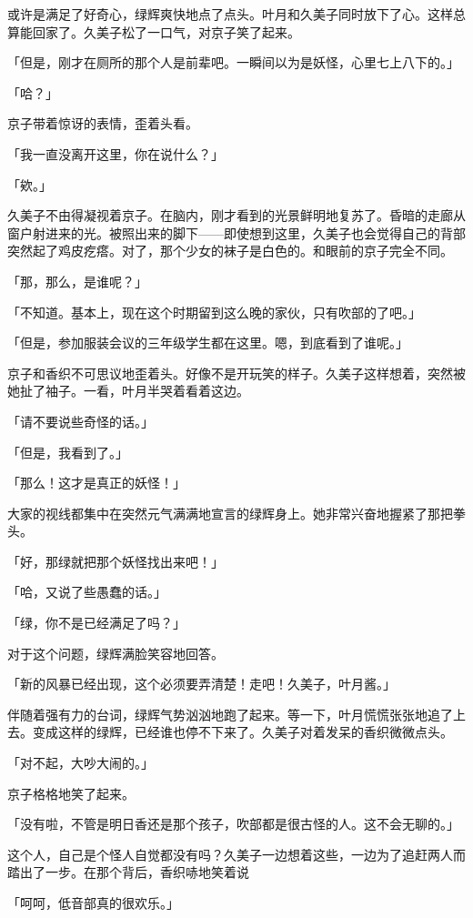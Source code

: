 \documentclass[UTF8]{ctexart}
\begin{document}
    或许是满足了好奇心，绿辉爽快地点了点头。叶月和久美子同时放下了心。这样总算能回家了。久美子松了一口气，对京子笑了起来。

    「但是，刚才在厕所的那个人是前辈吧。一瞬间以为是妖怪，心里七上八下的。」

    「哈？」

    京子带着惊讶的表情，歪着头看。

    「我一直没离开这里，你在说什么？」

    「欸。」

    久美子不由得凝视着京子。在脑内，刚才看到的光景鲜明地复苏了。昏暗的走廊从窗户射进来的光。被照出来的脚下——即使想到这里，久美子也会觉得自己的背部突然起了鸡皮疙瘩。对了，那个少女的袜子是白色的。和眼前的京子完全不同。

    「那，那么，是谁呢？」

    「不知道。基本上，现在这个时期留到这么晚的家伙，只有吹部的了吧。」

    「但是，参加服装会议的三年级学生都在这里。嗯，到底看到了谁呢。」

    京子和香织不可思议地歪着头。好像不是开玩笑的样子。久美子这样想着，突然被她扯了袖子。一看，叶月半哭着看着这边。

    「请不要说些奇怪的话。」

    「但是，我看到了。」

    「那么！这才是真正的妖怪！」

    大家的视线都集中在突然元气满满地宣言的绿辉身上。她非常兴奋地握紧了那把拳头。

    「好，那绿就把那个妖怪找出来吧！」

    「哈，又说了些愚蠢的话。」

    「绿，你不是已经满足了吗？」

    对于这个问题，绿辉满脸笑容地回答。

    「新的风暴已经出现，这个必须要弄清楚！走吧！久美子，叶月酱。」

    伴随着强有力的台词，绿辉气势汹汹地跑了起来。等一下，叶月慌慌张张地追了上去。变成这样的绿辉，已经谁也停不下来了。久美子对着发呆的香织微微点头。

    「对不起，大吵大闹的。」

    京子格格地笑了起来。

    「没有啦，不管是明日香还是那个孩子，吹部都是很古怪的人。这不会无聊的。」

    这个人，自己是个怪人自觉都没有吗？久美子一边想着这些，一边为了追赶两人而踏出了一步。在那个背后，香织哧地笑着说

    「呵呵，低音部真的很欢乐。」
\end{document}
